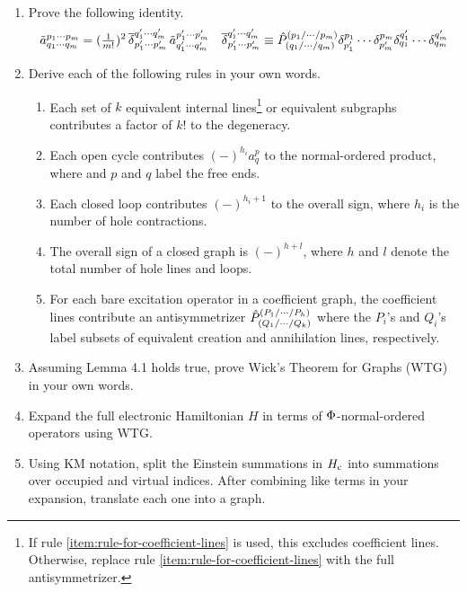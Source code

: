 \documentclass[11pt]{article}
\begin{document}
\begin{enumerate}
\item
  Prove the following identity.
\begin{align}
  \tilde{a}^{p_1\cdots p_m}_{q_1\cdots q_m}
=
  (\tfrac{1}{m!})^2\,
  \overline{\delta }_{p_1'\cdots p_m'}^{q_1'\cdots q_m'}\,
  \tilde{a}^{p_1'\cdots p_m'}_{q_1'\cdots q_m'}
&&
  \overline{\delta }^{q_1'\cdots q_m'}_{p_1'\cdots p_m'}
\equiv
  \hat{P}^{(p_1/\cdots /p_m)}
        _{(q_1/\cdots /q_m)}
  \delta ^{p_1}_{p_1'}\cdots \delta ^{p_m}_{p_m'}
  \delta ^{q_1'}_{q_1}\cdots \delta ^{q_m'}_{q_m}
\end{align}

\item
  Derive each of the following rules in your own words.
{\small
\begin{enumerate}
\item
  Each set of $k$ equivalent internal lines\footnote{If rule \ref{item:rule-for-coefficient-lines} is used, this excludes coefficient lines.  Otherwise, replace rule \ref{item:rule-for-coefficient-lines} with the full antisymmetrizer.} or equivalent subgraphs contributes a factor of $k!$ to the degeneracy.
\item
  Each open cycle contributes $(-)^{h_i}a^p_q$ to the normal-ordered product, where and $p$ and $q$ label the free ends.
\item
  Each closed loop contributes $(-)^{h_i+1}$ to the overall sign, where $h_i$ is the number of hole contractions.
\item
  The overall sign of a closed graph is $(-)^{h+l}$, where $h$ and $l$ denote the total number of hole lines and loops.
\item\label{item:rule-for-coefficient-lines}
  For each bare excitation operator in a coefficient graph, the coefficient lines contribute an antisymmetrizer
  $\hat{P}^{(P_1/\cdots /P_h)}_{(Q_1/\cdots /Q_k)}$
  where the $P_i$'s and $Q_i$'s label subsets of equivalent creation and annihilation lines, respectively.
\end{enumerate}}

\item
  Assuming Lemma 4.1 holds true, prove Wick's Theorem for Graphs (WTG) in your own words.

\item
  Expand the full electronic Hamiltonian $H$ in terms of $\Phi $-normal-ordered operators using WTG.

\item
  Using KM notation, split the Einstein summations in $H_{\mathrm{c}}$ into summations over occupied and virtual indices.
  After combining like terms in your expansion, translate each one into a graph.


\end{enumerate}
\end{document}
